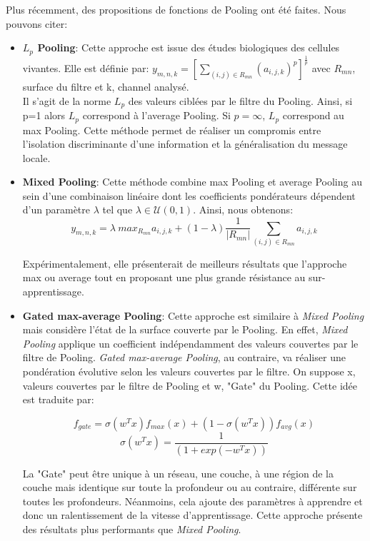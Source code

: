 \noindent Plus récemment, des propositions de fonctions de Pooling ont été faites. Nous pouvons citer:
\begin{itemize}
    \item \textbf{$L_p$ Pooling}\cite{lppool}: Cette approche est issue des études biologiques des cellules vivantes. Elle est définie par: $y_{m,n,k}=\left[\sum_{(i,j) \in R_{mn}} (a_{i,j,k})^p \right]^{\frac{1}{p}}$ avec $R_{mn}$, surface du filtre et k, channel analysé.\\

    Il s'agit de la norme $L_p$ des valeurs ciblées par le filtre du Pooling. Ainsi, si p=1 alors $L_p$ correspond à l'average Pooling. Si $p= \infty$, $L_p$ correspond au max Pooling. Cette méthode permet de réaliser un compromis entre l'isolation discriminante d'une information et la généralisation du message locale.

    \item \textbf{Mixed Pooling}\cite{mixedpool}: Cette méthode combine max Pooling et average Pooling au sein d'une combinaison linéaire dont les coefficients pondérateurs dépendent d'un paramètre $\lambda$ tel que $\lambda \in \mathcal{U}(0,1)$. Ainsi, nous obtenons: $$y_{m,n,k}=\lambda \  max_{R_{mn}}a_{i,j,k}+(1-\lambda)\frac{1}{|R_{mn}|}\sum_{(i,j)\in R_{mn}}a_{i,j,k}$$

    Expérimentalement, elle présenterait de meilleurs résultats que l'approche max ou average tout en proposant une plus grande résistance au sur-apprentissage.

    \item \textbf{Gated max-average Pooling}\cite{mixedpool}: Cette approche est similaire à \textit{Mixed Pooling} mais considère l'état de la surface couverte par le Pooling. En effet, \textit{Mixed Pooling} applique un coefficient indépendamment des valeurs couvertes par le filtre de Pooling. \textit{Gated max-average Pooling}, au contraire, va réaliser une pondération évolutive selon les valeurs couvertes par le filtre. On suppose x, valeurs couvertes par le filtre de Pooling et w, "Gate" du Pooling. Cette idée est traduite par:

    $$ f_{gate}=\sigma(w^Tx)f_{max}(x)+(1-\sigma(w^Tx))f_{avg}(x)$$
    $$\sigma(w^Tx)=\frac{1}{(1+exp(-w^Tx))} $$

    La "Gate" peut être unique à un réseau, une couche, à une région de la couche mais identique sur toute la profondeur ou au contraire, différente sur toutes les profondeurs. Néanmoins, cela ajoute des paramètres à apprendre et donc un ralentissement de la vitesse d'apprentissage. Cette approche présente des résultats plus performants que \textit{Mixed Pooling}.


\end{itemize}
